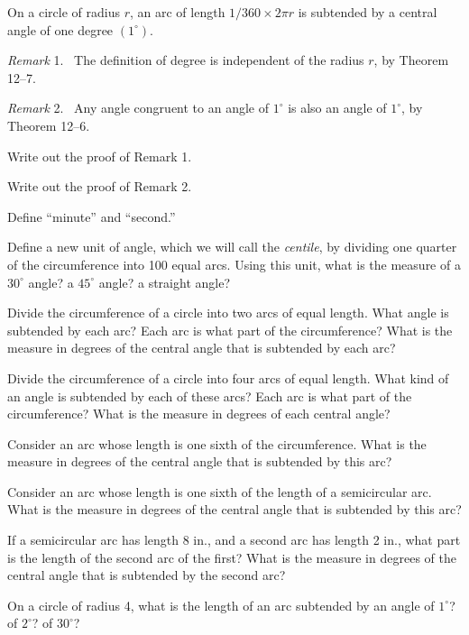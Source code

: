 \documentclass[11pt]{book}
\newenvironment{XIIremarkn}[1]{\par\medskip\noindent\emph{Remark} #1.\ }%
  {\par\medskip}
\begin{document}
\begin{definition}
On a circle of radius $r$, an arc of length $1/360 \times 2\pi r$ is subtended
by a central angle of one degree $(1^\circ)$.
\end{definition}

\begin{XIIremarkn}{1}
The definition of degree is independent of the radius $r$, by
Theorem 12--7.
\end{XIIremarkn}

\begin{XIIremarkn}{2}
Any angle congruent to an angle of $1^\circ$ is also an angle of
$1^\circ$, by Theorem 12--6.
\end{XIIremarkn}

\begin{exercisecols}
\begin{exlist}
\item Write out the proof of Remark 1.
\item Write out the proof of Remark 2.
\item Define ``minute'' and ``second.''
\item Define a new unit of angle, which we will call the \emph{centile}, by
      dividing one quarter of the circumference into 100 equal arcs. Using this
      unit, what is the measure of a $30^\circ$ angle? a $45^\circ$ angle? a
      straight angle?
\item Divide the circumference of a circle into two arcs of equal length. What
      angle is subtended by each arc? Each arc is what part of the
      circumference? What is the measure in degrees of the central angle that is
      subtended by each arc?
\item Divide the circumference of a circle into four arcs of equal length. What
      kind of an angle is subtended by each of these arcs? Each arc is what part
      of the circumference? What is the measure in degrees of each central
      angle?
\item Consider an arc whose length is one sixth of the circumference. What is
      the measure in degrees of the central angle that is subtended by this arc?
\item Consider an arc whose length is one sixth of the length of a semicircular
      arc. What is the measure in degrees of the central angle that is subtended
      by this arc?
\item If a semicircular arc has length 8 in., and a second arc has length 2 in.,
      what part is the length of the second arc of the first? What is the
      measure in degrees of the central angle that is subtended by the second
      arc?
\item On a circle of radius 4, what is the length of an arc subtended by an
      angle of $1^\circ$? of $2^\circ$? of $30^\circ$?
\end{exlist}
\end{exercisecols}
\end{document}
